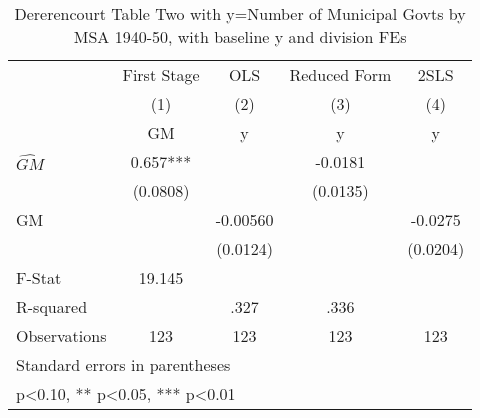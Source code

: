 \begin{table}[htbp]\centering
\def\sym#1{\ifmmode^{#1}\else\(^{#1}\)\fi}
\caption{Dererencourt Table Two with y=Number of Municipal Govts by MSA 1940-50, with baseline y and division FEs}
\begin{tabular}{l*{4}{c}}
\toprule
                    & First Stage   &         OLS   &Reduced Form   &        2SLS   \\
                    &\multicolumn{1}{c}{(1)}&\multicolumn{1}{c}{(2)}&\multicolumn{1}{c}{(3)}&\multicolumn{1}{c}{(4)}\\
                    &\multicolumn{1}{c}{GM}&\multicolumn{1}{c}{y}&\multicolumn{1}{c}{y}&\multicolumn{1}{c}{y}\\
\midrule
$\hat{GM}$          &       0.657***&               &     -0.0181   &               \\
                    &    (0.0808)   &               &    (0.0135)   &               \\
\addlinespace
GM                  &               &    -0.00560   &               &     -0.0275   \\
                    &               &    (0.0124)   &               &    (0.0204)   \\
\midrule
F-Stat              &      19.145   &               &               &               \\
R-squared           &               &        .327   &        .336   &               \\
Observations        &         123   &         123   &         123   &         123   \\
\bottomrule
\multicolumn{5}{l}{\footnotesize Standard errors in parentheses}\\
\multicolumn{5}{l}{\footnotesize * p<0.10, ** p<0.05, *** p<0.01}\\
\end{tabular}
\end{table}
